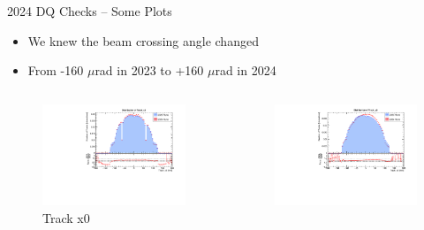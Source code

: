 \begin{frame}{2024 DQ Checks -- Some Plots}
    \begin{itemize}
        \item We knew the beam crossing angle changed 
        \item From -160 $\mu$rad in 2023 to +160 $\mu$rad in 2024 
    \end{itemize}
    \begin{columns}
        \begin{column}{0.5 \textwidth}
            \begin{figure}
                \centering
                \includegraphics[width=\textwidth]{assets/Track_x0.pdf}
                \caption{Track x0}
            \end{figure}
        \end{column}
        \begin{column}{0.5 \textwidth}
            \begin{figure}
                \centering
                \includegraphics[width=\textwidth]{assets/Track_y0.pdf}

\end{figure}
\end{column}
\end{columns}
\end{frame}
